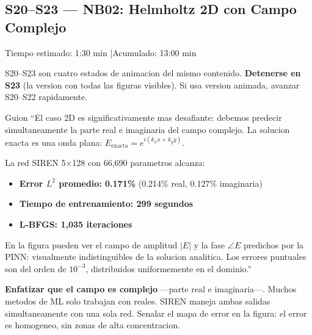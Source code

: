 \subsection{S20--S23 --- NB02: Helmholtz 2D con Campo Complejo}

\begin{timebox}
Tiempo estimado: 1:30 min \quad|\quad Acumulado: 13:00 min
\end{timebox}
\vspace{4pt}

\begin{warningbox}
S20--S23 son cuatro estados de animacion del mismo contenido.
\textbf{Detenerse en S23} (la version con todas las figuras visibles).
Si usa version animada, avanzar S20--S22 rapidamente.
\end{warningbox}
\vspace{4pt}

\begin{slidebox}{Guion}
``El caso 2D es significativamente mas desafiante: debemos predecir simultaneamente
la parte real e imaginaria del campo complejo. La solucion exacta es una onda plana:
$E_\text{exacta} = e^{i(k_x x + k_y y)}$.

La red SIREN 5$\times$128 con 66,690 parametros alcanza:
\begin{itemize}
  \item \textbf{Error $L^2$ promedio: 0.171\%} (0.214\% real, 0.127\% imaginaria)
  \item \textbf{Tiempo de entrenamiento: 299 segundos}
  \item \textbf{L-BFGS: 1,035 iteraciones}
\end{itemize}
En la figura pueden ver el campo de amplitud $|E|$ y la fase $\angle E$ predichos
por la PINN: visualmente indistinguibles de la solucion analitica. Los errores
puntuales son del orden de $10^{-3}$, distribuidos uniformemente en el dominio.''
\end{slidebox}
\vspace{4pt}

\begin{tipbox}
\textbf{Enfatizar que el campo es complejo} ---parte real e imaginaria---.
Muchos metodos de ML solo trabajan con reales. SIREN maneja ambas salidas
simultaneamente con una sola red. Senalar el mapa de error en la figura:
el error es homogeneo, sin zonas de alta concentracion.
\end{tipbox}

\vspace{8pt}

